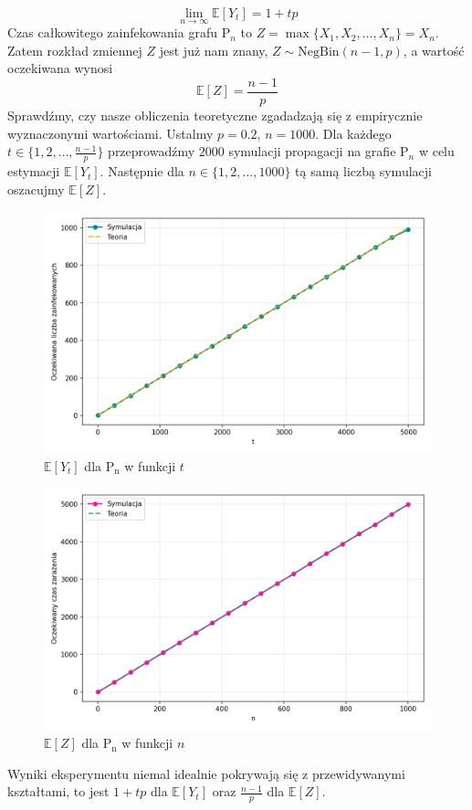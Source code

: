 \[
    \lim_{n \to \infty}\mathbb{E}[Y_t] = 1+tp
\]
Czas całkowitego zainfekowania grafu $\mathrm{P}_n$ to $Z = \max\{X_1,X_2,\dots,X_n\} = X_n$. Zatem rozkład zmiennej $Z$ jest już nam znany, $Z\sim\mathrm{NegBin}(n-1,p)$, a wartość oczekiwana wynosi 
\[
    \mathbb{E}[Z]=\frac{n-1}{p}
\]
Sprawdźmy, czy nasze obliczenia teoretyczne zgadadzają się z empirycznie wyznaczonymi wartościami. Ustalmy $p=0.2$, $n=1000$. Dla każdego $t\in\{1, 2, \dots, \frac{n-1}{p}\}$ przeprowadźmy $2000$ symulacji propagacji na grafie $\mathrm{P}_n$ w celu estymacji $\mathbb{E}[Y_t]$. Następnie dla $n\in\{1,2,\dots,1000\}$ tą samą liczbą symulacji oszacujmy $\mathbb{E}[Z]$. 
\begin{figure}[h!]
    \centering
    \includegraphics[width=1\textwidth]{../img/path/final_infection_expectations.png}
    \caption{$\mathbb{E}[Y_t]$ dla $\mathrm{P_n}$ w funkcji $t$}
\end{figure}
\begin{figure}[h!]
    \centering
    \includegraphics[width=1\textwidth]{../img/path/full_infection_expectation.png}
    \caption{$\mathbb{E}[Z]$ dla $\mathrm{P_n}$ w funkcji $n$}
\end{figure}
Wyniki eksperymentu niemal idealnie pokrywają się z przewidywanymi kształtami, to jest $1+tp$ dla $\mathbb{E}[Y_t]$ oraz $\frac{n-1}{p}$ dla $\mathbb{E}[Z]$.


